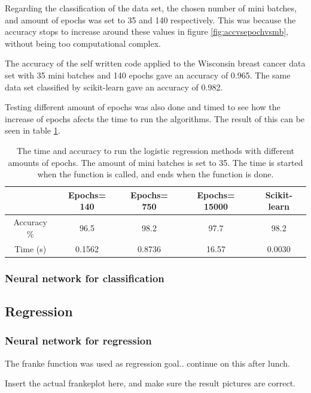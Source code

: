 \documentclass[../main.tex]{subfiles}
\begin{document}
Regarding the classification of the data set, the chosen number of mini batches, and amount of epochs was set to 35 and 140 respectively. This was because the accuracy stops to increase around these values in figure \ref{fig:accvsepochvsmb}, without being too computational complex. 

The accuracy of the self written code applied to the Wisconsin breast cancer data set with 35 mini batches and 140 epochs gave an accuracy of 0.965. The same data set classified by scikit-learn gave an accuracy of 0.982.

Testing different amount of epochs was also done and timed to see how the increase of epochs afects the time to run the algorithms. The result of this can be seen in table \ref{tab:timetime}.


\begin{table}[H]
\centering
\caption{The time and accuracy to run the logistic regression methods with different amounts of epochs. The amount of mini batches is set to 35. The time is started when the function is called, and ends when the function is done.}
\begin{tabular}{ ccccc } 
 \toprule
  & Epochs= 140 & Epochs= 750 & Epochs= 15000 & Scikit-learn \\ 
 \midrule
 Accuracy \%  & 96.5 & 98.2 & 97.7 & 98.2\\
 
 Time (s) & 0.1562 & 0.8736 & 16.57 & 0.0030 \\ 
 \bottomrule
\end{tabular}
\label{tab:timetime}
\end{table}


\subsubsection{Neural network for classification}

\subsection{Regression}
\subsubsection{Neural network for regression}
The franke function was used as regression goal.. continue on this after lunch.

Insert the actual frankeplot here, and make sure the result pictures are correct.
\end{document}
